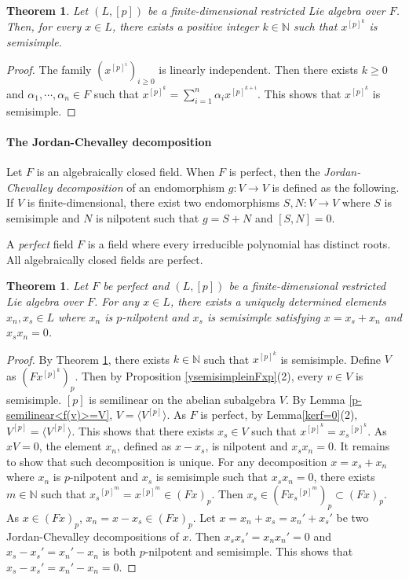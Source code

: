 \documentclass[12pt,MSc]{muthesis_2023}
\theoremstyle{plain}%
\newtheorem{Theorem}[FactCounter]{Theorem} %
\theoremstyle{definition}
\theoremstyle{remark}
\begin{document}
\begin{Theorem}\label{x[p]ksemisimple}
Let $(L, [p])$ be a finite-dimensional restricted Lie algebra over $F$. Then, for every $x\in L$, there exists a positive integer $k\in\mathbb{N}$ such that $x^{[p]^k}$ is semisimple.
\end{Theorem}

\begin{proof}
The family $(x^{[p]^i})_{i\geq0}$ is linearly independent. Then there exists $k\geq 0$ and $\alpha_1,\cdots, \alpha_n \in F$ such that $x^{[p]^k}=\sum_{i=1}^n \alpha_i x^{[p]^{k+i}}$. This shows that $x^{[p]^k}$ is semisimple.
\end{proof}


\paragraph{The Jordan-Chevalley decomposition}
Let $F$ is an algebraically closed field. When $F$ is perfect, then the \textit{Jordan-Chevalley decomposition} of an endomorphism $g:V\rightarrow V$ is defined as the following. If $V$ is finite-dimensional, there exist two endomorphisms $S,N:V\rightarrow V$ where $S$ is semisimple and $N$ is nilpotent such that $g=S+N$ and $[S, N]=0$.

A \textit{perfect} field $F$ is a field where every irreducible polynomial has distinct roots. All algebraically closed fields are perfect.

\begin{Theorem}\label{jordandecomp}
Let $F$ be perfect and $(L, [p])$ be a finite-dimensional restricted Lie algebra over $F$. For any $x\in L$, there exists a uniquely determined elements $x_n, x_s\in L$ where $x_n$ is $p$-nilpotent and $x_s$ is semisimple satisfying $x=x_s+x_n$ and $x_sx_n=0$.
\end{Theorem}

\begin{proof}
By Theorem \ref{x[p]ksemisimple}, there exists $k\in \mathbb{N}$ such that $x^{[p]^k}$ is semisimple. Define $V$ as $(Fx^{[p]^k})_p$. Then by Proposition \ref{ysemisimpleinFxp}(2), every $v\in V$ is semisimple. $[p]$ is semilinear on the abelian subalgebra $V$. By Lemma \ref{p-semilinear<f(v)>=V}, $V=\langle V^{[p]}\rangle$. As $F$ is perfect, by Lemma\ref{kerf=0}(2), $V^{[p]}=\langle V^{[p]}\rangle$. This shows that there exists $x_s \in V$ such that $x^{[p]^k}={x_s}^{[p]^k}$. As $xV=0$, the element $x_n$, defined as $x-x_s$, is nilpotent and $x_sx_n=0$. It remains to show that such decomposition is unique. For any decomposition $x=x_s+x_n$ where $x_n$ is $p$-nilpotent and $x_s$ is semisimple such that $x_sx_n=0$, there exists $m\in \mathbb{N}$ such that ${x_s}^{[p]^m}=x^{[p]^m}\in (Fx)_p$. Then $x_s\in (F{x_s}^{[p]^m})_p\subset (Fx)_p$. As $x\in (Fx)_p$, $x_n=x-x_s\in (Fx)_p$. Let $x=x_n+x_s={x_n}'+{x_s}'$ be two Jordan-Chevalley decompositions of $x$. Then $x_s{x_s}'=x_n{x_n}'=0$ and $x_s-{x_s}'={x_n}'-x_n$ is both $p$-nilpotent and semisimple. This shows that $x_s-{x_s}'={x_n}'-x_n=0$.
\end{proof}
\end{document}
